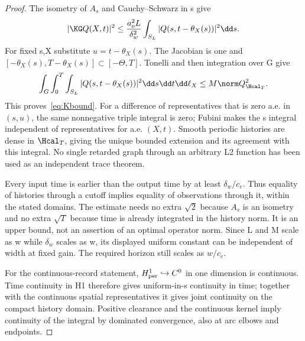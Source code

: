 \begin{proof}
The isometry of $A_s$ and Cauchy--Schwarz in s give
\begin{equation}\label{eq:pointestimate}
|\KG Q(X,t)|^2\le\frac{a_o^2L}{\delta_w^2}
\int_{S_L}|Q(s,t-\theta_X(s))|^2\dd s.
\end{equation}
For fixed s,X substitute $u=t-\theta_X(s)$. The Jacobian is one and
$[-\theta_X(s),T-\theta_X(s)]\subset[-\Theta,T]$. Tonelli and then integration over G give
\begin{equation}\label{eq:translatedestimate}
\int_G\int_0^T\int_{S_L}|Q(s,t-\theta_X(s))|^2\dd s\dd t\dd\ell_X
\le M\norm Q_{\Hcal_T}^2.
\end{equation}
This proves~\eqref{eq:Kbound}. For a difference of representatives that is zero a.e. in $(s,u)$, the same nonnegative triple integral is zero; Fubini makes the s integral independent of representatives for a.e. $(X,t)$. Smooth periodic histories are dense in $\Hcal_T$, giving the unique bounded extension and its agreement with this integral. No single retarded graph through an arbitrary L2 function has been used as an independent trace theorem.

Every input time is earlier than the output time by at least $\delta_w/c_e$. Thus equality of histories through a cutoff implies equality of observations through it, within the stated domains. The estimate needs no extra $\sqrt2$ because $A_s$ is an isometry and no extra $\sqrt T$ because time is already integrated in the history norm. It is an upper bound, not an assertion of an optimal operator norm. Since L and M scale as w while $\delta_w$ scales as w, its displayed uniform constant can be independent of width at fixed gain. The required horizon still scales as $w/c_e$.

For the continuous-record statement, $H^1_{\rm per}\hookrightarrow C^0$ in one dimension is continuous. Time continuity in H1 therefore gives uniform-in-s continuity in time; together with the continuous spatial representatives it gives joint continuity on the compact history domain. Positive clearance and the continuous kernel imply continuity of the integral by dominated convergence, also at arc elbows and endpoints.


\end{proof}
